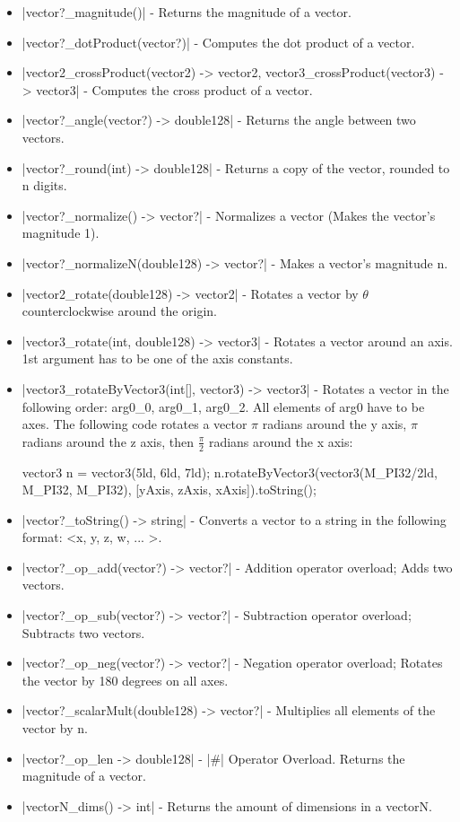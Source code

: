 \documentclass[12pt, letterpaper, oneside]{article}
\begin{document}
	\begin{itemize}
		\item[--] \spverb|vector?_magnitude()| - Returns the magnitude of a vector.
		\item[--] \spverb|vector?_dotProduct(vector?)| - Computes the dot product of a vector.
		\item[--] \spverb|vector2_crossProduct(vector2) -> vector2, vector3_crossProduct(vector3) -> vector3| - Computes the cross product of a vector.
		\item[--] \spverb|vector?_angle(vector?) -> double128| - Returns the angle between two vectors.
		\item[--] \spverb|vector?_round(int) -> double128| - Returns a copy of the vector, rounded to n digits.
		\item[--] \spverb|vector?_normalize() -> vector?| - Normalizes a vector (Makes the vector's magnitude 1).
		\item[--] \spverb|vector?_normalizeN(double128) -> vector?| - Makes a vector's magnitude n.
		\item[--] \spverb|vector2_rotate(double128) -> vector2| - Rotates a vector by $\theta$ counterclockwise around the origin.
		\item[--] \spverb|vector3_rotate(int, double128) -> vector3| - Rotates a vector around an axis. 1st argument has to be one of the axis constants.
		\item[--] \spverb|vector3_rotateByVector3(int[], vector3) -> vector3| - Rotates a vector in the following order: arg0\_0, arg0\_1, arg0\_2. All elements of arg0 have to be axes. The following code rotates a vector $\pi$ radians around the y axis, $\pi$ radians around the z axis, then $\frac{\pi}{2}$ radians around the x axis:
		
		
		\begin{spverbatim}
			vector3 n = vector3(5ld, 6ld, 7ld);
			n.rotateByVector3(vector3(M_PI32/2ld, M_PI32, M_PI32), [yAxis, zAxis, xAxis]).toString();
		\end{spverbatim}
		\item[--] \spverb|vector?_toString() -> string| - Converts a vector to a string in the following format: <x, y, z, w, ... >.
		\item[--] \spverb|vector?_op_add(vector?) -> vector?| - Addition operator overload; Adds two vectors.
		\item[--] \spverb|vector?_op_sub(vector?) -> vector?| - Subtraction operator overload; Subtracts two vectors.
		\item[--] \spverb|vector?_op_neg(vector?) -> vector?| - Negation operator overload; Rotates the vector by 180 degrees on all axes.
		\item[--] \spverb|vector?_scalarMult(double128) -> vector?| - Multiplies all elements of the vector by n.
		\item[--] \spverb|vector?_op_len -> double128| - \spverb|#| Operator Overload. Returns the magnitude of a vector.
		\item[--] \spverb|vectorN_dims() -> int| - Returns the amount of dimensions in a vectorN.
	\end{itemize}
	\newpage
\end{document}
